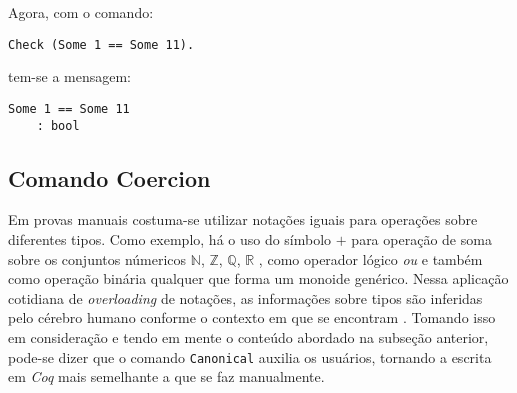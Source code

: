 Agora, com o comando:
    \begin{lstlisting}[language = coq,frame=single,tabsize=1]
Check (Some 1 == Some 11).
    \end{lstlisting}
tem-se a mensagem:
    \begin{lstlisting}[language = coq-error,frame=single,tabsize=1]
Some 1 == Some 11
    : bool
    \end{lstlisting}

\subsection{Comando Coercion} \label{subsection:coercion}

Em provas manuais costuma-se utilizar notações iguais para operações sobre diferentes tipos. Como exemplo, há o uso do símbolo $+$ para operação de soma sobre os conjuntos númericos $\mathbb{N}$, $\mathbb{Z}$, $\mathbb{Q}$, $\mathbb{R}$ , como operador lógico \textit{ou} e também como operação binária qualquer que forma um monoide genérico. Nessa aplicação cotidiana de \textit{overloading} de notações, as informações sobre tipos são inferidas pelo cérebro humano conforme o contexto em que se encontram \cite{10.1007/978-3-642-39634-2_5}. 
Tomando isso em consideração e tendo em mente o conteúdo abordado na subseção anterior, pode-se dizer que o comando \lstinline[language = coq]$Canonical$ auxilia os usuários, tornando a escrita em \textit{Coq} mais semelhante a que se faz manualmente.

